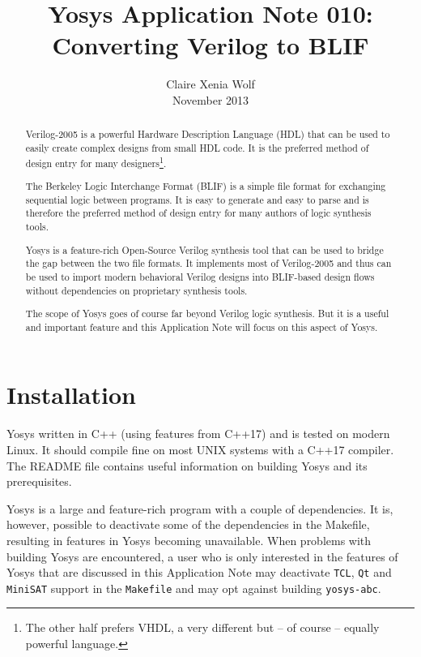 \documentclass[9pt,technote,a4paper]{IEEEtran}
\begin{document}
\title{Yosys Application Note 010: \\ Converting Verilog to BLIF}
\author{Claire Xenia Wolf \\ November 2013}
\maketitle

\begin{abstract}
Verilog-2005 is a powerful Hardware Description Language (HDL) that can be used
to easily create complex designs from small HDL code. It is the preferred
method of design entry for many designers\footnote{The other half prefers VHDL,
a very different but -- of course -- equally powerful language.}.

The Berkeley Logic Interchange Format (BLIF) \cite{blif} is a simple file format for
exchanging sequential logic between programs. It is easy to generate and
easy to parse and is therefore the preferred method of design entry for
many authors of logic synthesis tools.

Yosys \cite{yosys} is a feature-rich
Open-Source Verilog synthesis tool that can be used to bridge the gap between
the two file formats. It implements most of Verilog-2005 and thus can be used
to import modern behavioral Verilog designs into BLIF-based design flows
without dependencies on proprietary synthesis tools.

The scope of Yosys goes of course far beyond Verilog logic synthesis. But
it is a useful and important feature and this Application Note will focus
on this aspect of Yosys.
\end{abstract}

\section{Installation}

Yosys written in C++ (using features from C++17) and is tested on modern Linux.
It should compile fine on most UNIX systems with a C++17 compiler. The README
file contains useful information on building Yosys and its prerequisites.

Yosys is a large and feature-rich program with a couple of dependencies. It is,
however, possible to deactivate some of the dependencies in the Makefile,
resulting in features in Yosys becoming unavailable. When problems with building
Yosys are encountered, a user who is only interested in the features of Yosys
that are discussed in this Application Note may deactivate {\tt TCL}, {\tt Qt}
and {\tt MiniSAT} support in the {\tt Makefile} and may opt against building
{\tt yosys-abc}.
\end{document}
